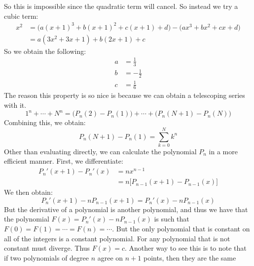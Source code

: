 \documentclass[crop=false,class=book,oneside]{standalone}
\begin{document}
            So this is impossible since the quadratic term will
            cancel. So instead we try a cubic term:
            \begin{align}
                x^{2}&=
                \big(a(x+1)^{3}+b(x+1)^{2}+c(x+1)+d)-
                \big(ax^{3}+bx^{2}+cx+d)\\
                &=a(3x^{2}+3x+1)+b(2x+1)+c
            \end{align}
            So we obtain the following:
            \begin{align}
                a&=\frac{1}{3}\\
                b&=-\frac{1}{2}\\
                c&=\frac{1}{6}
            \end{align}
            The reason this property is so nice is because we can
            obtain a telescoping series with it.
            \begin{equation}
                1^{n}+\cdots+N^{n}
                =\big(P_{n}(2)-P_{n}(1)\big)+\cdots+
                \big(P_{n}(N+1)-P_{n}(N)\big)
            \end{equation}
            Combining this, we obtain:
            \begin{equation}
                P_{n}(N+1)-P_{n}(1)=\sum_{k=0}^{N}k^{n}
            \end{equation}
            Other than evaluating directly, we can calculate the
            polynomial $P_{n}$ in a more efficient manner. First,
            we differentiate:
            \begin{align}
                P_{n}'(x+1)-P_{n}'(x)&=nx^{n-1}\\
                &=n\big[P_{n-1}(x+1)-P_{n-1}(x)\big]
            \end{align}
            We then obtain:
            \begin{equation}
                P_{n}'(x+1)-nP_{n-1}(x+1)=P_{n}'(x)-nP_{n-1}(x)
            \end{equation}
            But the derivative of a polynomial is another
            polynomial, and thus we have that the polynomial
            $F(x)=P_{n}'(x)-nP_{n-1}(x)$ is such that
            $F(0)=F(1)=\cdots=F(n)=\cdots$. But the only polynomial
            that is constant on all of the integers is a constant
            polynomial. For any polynomial that is not constant
            must diverge. Thus $F(x)=c$. Another way to see this
            is to note that if two polynomials of degree $n$
            agree on $n+1$ points, then they are the same
\end{document}
